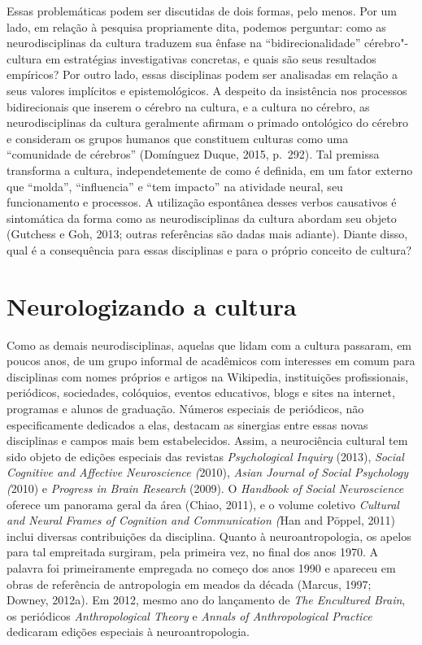 Essas problemáticas podem ser discutidas de dois formas, pelo menos. Por
um lado, em relação à pesquisa propriamente dita, podemos perguntar:
como as neurodisciplinas da cultura traduzem sua ênfase na
``bidirecionalidade'' cérebro"-cultura em estratégias investigativas
concretas, e quais são seus resultados empíricos? Por outro lado, essas
disciplinas podem ser analisadas em relação a seus valores implícitos e
epistemológicos. A despeito da insistência nos processos bidirecionais
que inserem o cérebro na cultura, e a cultura no cérebro, as
neurodisciplinas da cultura geralmente afirmam o primado ontológico do
cérebro e consideram os grupos humanos que constituem culturas como uma
``comunidade de cérebros'' (Domínguez Duque, 2015, p.~292). Tal premissa
transforma a cultura, independetemente de como é definida, em um fator
externo que ``molda'', ``influencia'' e ``tem impacto'' na atividade
neural, seu funcionamento e processos. A utilização espontânea desses
verbos causativos é sintomática da forma como as neurodisciplinas da
cultura abordam seu objeto (Gutchess e Goh, 2013; outras referências são
dadas mais adiante). Diante disso, qual é a consequência para essas
disciplinas e para o próprio conceito de cultura?

\chapter{Neurologizando a cultura}

Como as demais neurodisciplinas, aquelas que lidam com a cultura
passaram, em poucos anos, de um grupo informal de acadêmicos com
interesses em comum para disciplinas com nomes próprios e artigos na
Wikipedia, instituições profissionais, periódicos, sociedades,
colóquios, eventos educativos, blogs e sites na internet, programas e
alunos de graduação. Números especiais de periódicos, não
especificamente dedicados a elas, destacam as sinergias entre essas
novas disciplinas e campos mais bem estabelecidos. Assim, a neurociência
cultural tem sido objeto de edições especiais das revistas
\emph{Psychological Inquiry} (2013), \emph{Social Cognitive and
Affective Neuroscience (}2010), \emph{Asian Journal of Social Psychology
(}2010) e \emph{Progress in Brain Research} (2009). O \emph{Handbook of
Social Neuroscience} oferece um panorama geral da área (Chiao, 2011), e
o volume coletivo \emph{Cultural and Neural Frames of Cognition and
Communication (}Han and Pöppel, 2011) inclui diversas contribuições da
disciplina. Quanto à neuroantropologia, os apelos para tal empreitada
surgiram, pela primeira vez, no final dos anos 1970. A palavra foi
primeiramente empregada no começo dos anos 1990 e apareceu em obras de
referência de antropologia em meados da década (Marcus, 1997; Downey,
2012a). Em 2012, mesmo ano do lançamento de \emph{The Encultured Brain},
os periódicos \emph{Anthropological Theory} e \emph{Annals of
Anthropological Practice} dedicaram edições especiais à
neuroantropologia.

